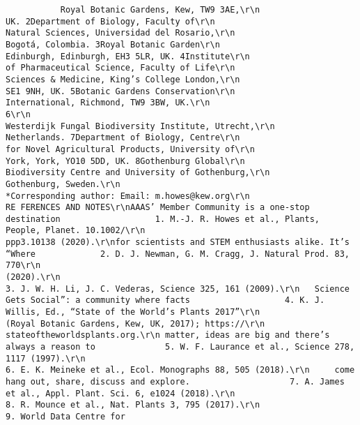 \documentclass[
]{book}
\begin{document}
\begin{verbatim}
           Royal Botanic Gardens, Kew, TW9 3AE,\r\n                                                              UK. 2Department of Biology, Faculty of\r\n                                                              Natural Sciences, Universidad del Rosario,\r\n                                                              Bogotá, Colombia. 3Royal Botanic Garden\r\n                                                              Edinburgh, Edinburgh, EH3 5LR, UK. 4Institute\r\n                                                              of Pharmaceutical Science, Faculty of Life\r\n                                                              Sciences & Medicine, King’s College London,\r\n                                                              SE1 9NH, UK. 5Botanic Gardens Conservation\r\n                                                              International, Richmond, TW9 3BW, UK.\r\n                                                              6\r\n                                                                Westerdijk Fungal Biodiversity Institute, Utrecht,\r\n                                                              Netherlands. 7Department of Biology, Centre\r\n                                                              for Novel Agricultural Products, University of\r\n                                                              York, York, YO10 5DD, UK. 8Gothenburg Global\r\n                                                              Biodiversity Centre and University of Gothenburg,\r\n                                                              Gothenburg, Sweden.\r\n                                                              *Corresponding author: Email: m.howes@kew.org\r\n                                                              RE FERENCES AND NOTES\r\nAAAS’ Member Community is a one-stop destination                   1. M.-J. R. Howes et al., Plants, People, Planet. 10.1002/\r\n                                                                      ppp3.10138 (2020).\r\nfor scientists and STEM enthusiasts alike. It’s “Where             2. D. J. Newman, G. M. Cragg, J. Natural Prod. 83, 770\r\n                                                                      (2020).\r\n                                                                   3. J. W. H. Li, J. C. Vederas, Science 325, 161 (2009).\r\n   Science Gets Social”: a community where facts                   4. K. J. Willis, Ed., “State of the World’s Plants 2017”\r\n                                                                      (Royal Botanic Gardens, Kew, UK, 2017); https://\r\n                                                                      stateoftheworldsplants.org.\r\n matter, ideas are big and there’s always a reason to              5. W. F. Laurance et al., Science 278, 1117 (1997).\r\n                                                                   6. E. K. Meineke et al., Ecol. Monographs 88, 505 (2018).\r\n     come hang out, share, discuss and explore.                    7. A. James et al., Appl. Plant. Sci. 6, e1024 (2018).\r\n                                                                   8. R. Mounce et al., Nat. Plants 3, 795 (2017).\r\n                                                                   9. World Data Centre for 
\end{verbatim}
\end{document}

